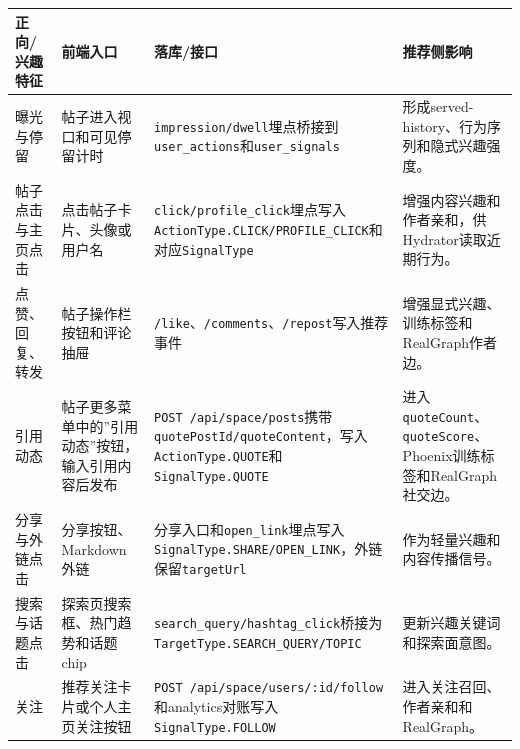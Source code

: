 \begingroup
{}
\scriptsize
\setlength{\tabcolsep}{3pt}
\begin{longtable}{L{0.11\textwidth}L{0.19\textwidth}L{0.25\textwidth}L{0.27\textwidth}}
  \toprule
  正向/兴趣特征   & 前端入口                       & 落库/接口                                                                                                                   & 推荐侧影响                                                               \\
  \midrule
  \endhead
  曝光与停留     & 帖子进入视口和可见停留计时              & \texttt{impression/dwell}埋点桥接到\texttt{user\_actions}和\texttt{user\_signals}                                             & 形成served-history、行为序列和隐式兴趣强度。                                       \\
  帖子点击与主页点击 & 点击帖子卡片、头像或用户名              & \texttt{click/profile\_click}埋点写入\texttt{ActionType.CLICK/PROFILE\_CLICK}和对应\texttt{SignalType}                         & 增强内容兴趣和作者亲和，供Hydrator读取近期行为。                                        \\
  点赞、回复、转发  & 帖子操作栏按钮和评论抽屉               & \texttt{/like}、\texttt{/comments}、\texttt{/repost}写入推荐事件                                                                & 增强显式兴趣、训练标签和RealGraph作者边。                                           \\
  引用动态      & 帖子更多菜单中的”引用动态”按钮，输入引用内容后发布 & \texttt{POST /api/space/posts}携带\texttt{quotePostId/quoteContent}，写入\texttt{ActionType.QUOTE}和\texttt{SignalType.QUOTE} & 进入\texttt{quoteCount}、\texttt{quoteScore}、Phoenix训练标签和RealGraph社交边。 \\
  分享与外链点击   & 分享按钮、Markdown外链            & 分享入口和\texttt{open\_link}埋点写入\texttt{SignalType.SHARE/OPEN\_LINK}，外链保留\texttt{targetUrl}                                 & 作为轻量兴趣和内容传播信号。                                                      \\
  搜索与话题点击   & 探索页搜索框、热门趋势和话题chip         & \texttt{search\_query/hashtag\_click}桥接为\texttt{TargetType.SEARCH\_QUERY/TOPIC}                                         & 更新兴趣关键词和探索面意图。                                                      \\
  关注        & 推荐关注卡片或个人主页关注按钮            & \texttt{POST /api/space/users/:id/follow}和analytics对账写入\texttt{SignalType.FOLLOW}                                       & 进入关注召回、作者亲和和RealGraph。                                              \\
  \bottomrule
\end{longtable}
\endgroup

